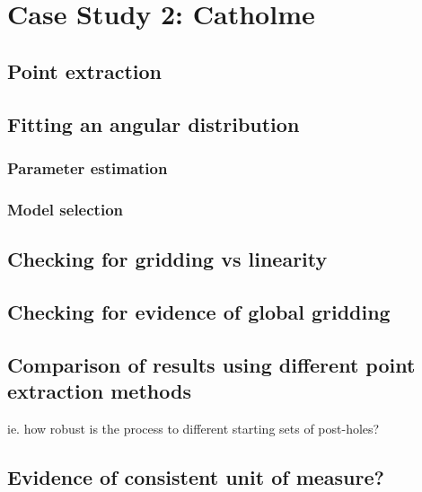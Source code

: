 \documentclass[../../ArchStats.tex]{subfiles}
\begin{document}
\section{Case Study 2: Catholme}

\subsection{Point extraction}

\subsection{Fitting an angular distribution}

\subsubsection{Parameter estimation}
\subsubsection{Model selection}

\subsection{Checking for gridding vs linearity}

\subsection{Checking for evidence of global gridding}

\subsection{Comparison of results using different point extraction methods}
ie. how robust is the process to different starting sets of post-holes?

\subsection{Evidence of consistent unit of measure?}
\end{document}
